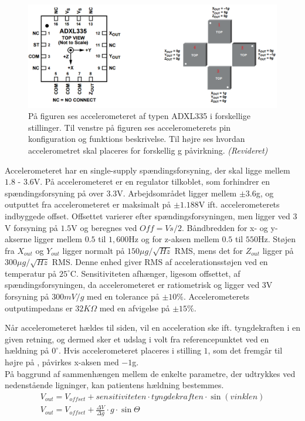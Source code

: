 \begin{figure}[H]
	\centering 
	\includegraphics[scale=0.5]{figures/cProblemloesning/ADXL335_2.JPG}
	\caption{På figuren ses accelerometeret af typen ADXL335 i forskellige stillinger. Til venstre på figuren ses accelerometerets pin konfiguration og funktions beskrivelse. Til højre ses hvordan accelerometret skal placeres for forskellig g påvirkning. \textit{(Revideret)} \cite{Devices2009}}
	\label{ADXL335}
\end{figure}

\noindent Accelerometeret har en single-supply spændingsforsyning, der skal ligge mellem $1.8$ - $3.6$V. På accelerometeret er en regulator tilkoblet, som forhindrer en spændingsforsyning på over $3.3$V.  Arbejdsområdet ligger mellem $\pm3.6$g, og outputtet fra accelerometeret er maksimalt på $\pm1.188$V ift. accelerometerets indbyggede offset. Offsettet varierer efter spændingsforsyningen, men ligger ved $3$V forsyning på $1.5$V og beregnes ved $Off = Vs/2$. Båndbredden for x- og y-akserne ligger mellem $0.5$ til $1,600$Hz og for z-aksen mellem $0.5$ til $550$Hz. Støjen fra $X_{out}$ og $Y_{out}$ ligger normalt på $150\mu g/\sqrt{Hz}$ RMS, mens det for $Z_{out}$ ligger på $300\mu g/\sqrt{Hz}$ RMS. Denne enhed giver RMS af accelerationsstøjen ved en temperatur på $25^\circ$C. Sensitiviteten afhænger, ligesom offsettet, af spændingsforsyningen, da accelerometeret er ratiometrisk og ligger ved $3$V forsyning på $300 mV/g$ med en tolerance på $\pm10\%$. Accelerometerets outputimpedans er $32K\Omega$ med en afvigelse på $\pm15\%$. \cite{Devices2009} %

Når accelerometeret hældes til siden, vil en acceleration ske ift. tyngdekraften i en given retning, og dermed sker et udslag i volt fra referencepunktet ved en hældning på $0^{\circ}$. Hvis accelerometeret placeres i stilling $1$, som det fremgår til højre på , påvirkes x-aksen med $-1$g.\cite{Devices2009} \\
På baggrund af sammenhængen mellem de enkelte parametre, der udtrykkes ved nedenstående ligninger, kan patientens hældning bestemmes.
\begin{align}
	V_{out} = V_{offset} + sensitiviteten \cdot tyngdekraften \cdot \sin(vinklen) \\
	V_{out} = V_{offset} + \frac{\Delta V}{\Delta g} \cdot g \cdot \sin \Theta
\end{align}

